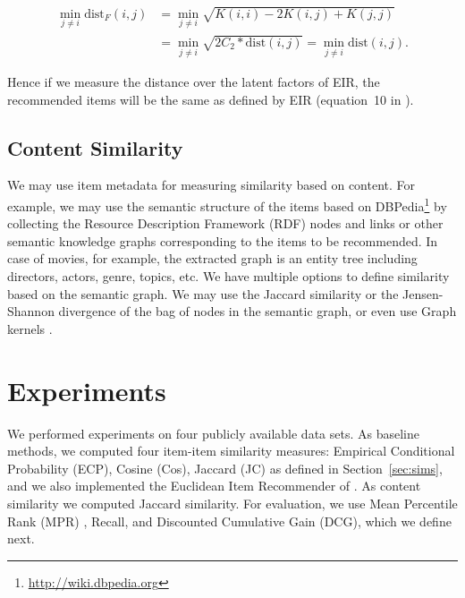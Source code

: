 \begin{equation}
\nonumber
\begin{split}
\min_{j \neq i} \text{dist}_F(i,j) &= \min_{j \neq i} \sqrt{K(i,i) - 2 K(i,j) + K(j,j)} \\
                   &= \min_{j \neq i} \sqrt{2C_2*\mbox{dist}(i,j)} = \min_{j \neq i} \mbox{dist}(i,j).
\end{split}
\end{equation}

Hence if we measure the distance over the latent factors of EIR, the recommended items will be the same as defined by EIR (equation~10 in \cite{koenigstein2013towards}).

\subsection{Content Similarity}

We may use item metadata for measuring similarity based on content.
For example, we may use the semantic structure of the items based on DBPedia\footnote{\url{http://wiki.dbpedia.org}} \cite{auer2007dbpedia} by collecting the 
Resource Description Framework (RDF) nodes and links or other semantic knowledge graphs corresponding to the items to be recommended.  %
In case of movies, for example, the extracted graph is an entity tree including directors, actors, genre, topics, etc. We have multiple options to define  similarity based on the semantic graph.
We may use the Jaccard similarity or the Jensen-Shannon divergence of the bag of nodes in the semantic graph, or even use Graph kernels \cite{losch2012graph}.

%
%

\section{Experiments}
\label{sec:experiments}

We performed experiments on four publicly available data sets.
As baseline methods, we computed four item-item similarity measures: Empirical Conditional Probability (ECP), Cosine 
(Cos), Jaccard (JC) as defined in Section~\ref{sec:sims}, 
and we also implemented the Euclidean Item Recommender of \cite{koenigstein2013towards}. 
As content similarity we computed Jaccard similarity. %
For evaluation, we use Mean Percentile Rank (MPR) \cite{koenigstein2013towards}, Recall, and Discounted Cumulative Gain (DCG), which we define next.

